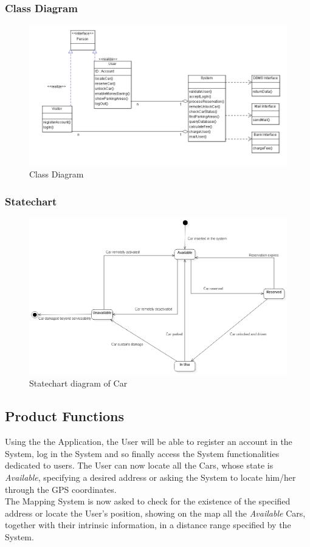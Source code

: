 \subsubsection{Class Diagram}
\begin{figure}[h]
\centering
\includegraphics[width=\linewidth,keepaspectratio]{../Diagrams/CD/Class_Diagram.png}
\caption{Class Diagram}
\end{figure}
\FloatBarrier

\subsubsection{Statechart}
\begin{figure}[h]
\centering
\includegraphics[width=\linewidth,keepaspectratio]{../Diagrams/SCD/SCD_Car.png}
\caption{Statechart diagram of Car}
\end{figure}
\FloatBarrier

\subsection{Product Functions}
Using the the Application, the User will be able to register an account in the System, log in the System and so finally access the System functionalities dedicated to users. The User can now locate all the Cars, whose state is \textit{Available}, specifying a desired address or asking the System to locate him/her through the GPS coordinates.\\
The Mapping System is now asked to check for the existence of the specified address or locate the User's position, showing on the map all the \textit{Available} Cars, together with their intrinsic information, in a distance range specified by the System. 
\smallskip

